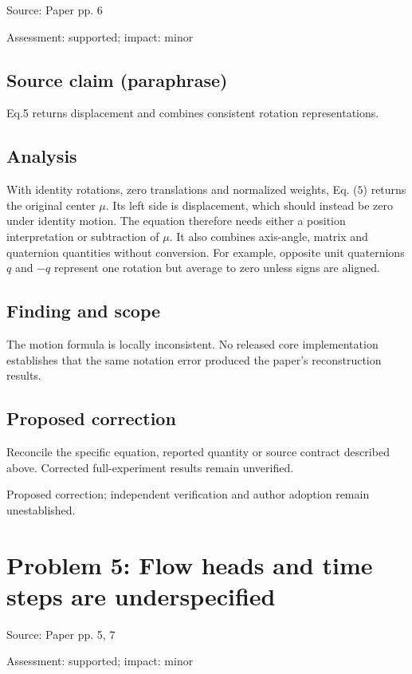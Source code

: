 \documentclass[11pt]{article}
\begin{document}
Source: Paper pp. 6

Assessment: supported; impact: minor

\subsection*{Source claim (paraphrase)}

Eq.5 returns displacement and combines consistent rotation representations.

\subsection*{Analysis}

With identity rotations, zero translations and normalized weights, Eq. (\(5\)) returns the original center \(\mu\). Its left side is displacement, which should instead be zero under identity motion. The equation therefore needs either a position interpretation or subtraction of \(\mu\). It also combines axis-angle, matrix and quaternion quantities without conversion. For example, opposite unit quaternions \(q\) and \(-q\) represent one rotation but average to zero unless signs are aligned.

\subsection*{Finding and scope}

The motion formula is locally inconsistent. No released core implementation establishes that the same notation error produced the paper's reconstruction results.

\subsection*{Proposed correction}

Reconcile the specific equation, reported quantity or source contract described above. Corrected full-experiment results remain unverified.

Proposed correction; independent verification and author adoption remain unestablished.

\section*{Problem 5: Flow heads and time steps are underspecified}

Source: Paper pp. 5, 7

Assessment: supported; impact: minor
\end{document}
